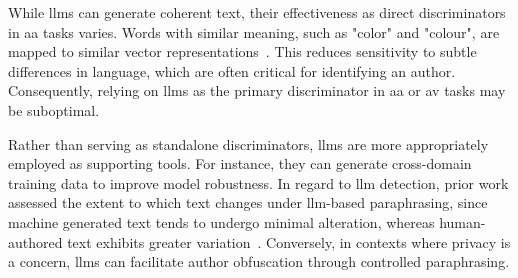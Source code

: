 While \acp{llm} can generate coherent text, their effectiveness as direct discriminators in \ac{aa} tasks varies. 
Words with similar meaning, such as "color" and "colour", are mapped to similar vector representations~\citep{altakrori_topic_2021}.
This reduces sensitivity to subtle differences in language, which are often critical for identifying an author. 
Consequently, relying on \acp{llm} as the primary discriminator in \ac{aa} or \ac{av} tasks may be suboptimal.

Rather than serving as standalone discriminators, \acp{llm} are more appropriately employed as supporting tools. 
For instance, they can generate cross-domain training data to improve model robustness. 
In regard to \ac{llm} detection, prior work assessed the extent to which text changes under \ac{llm}-based paraphrasing, since machine generated text tends to undergo minimal alteration, whereas human-authored text exhibits greater variation~\citep{mao_raidar_2024}.
Conversely, in contexts where privacy is a concern, \acp{llm} can facilitate author obfuscation through controlled paraphrasing. 